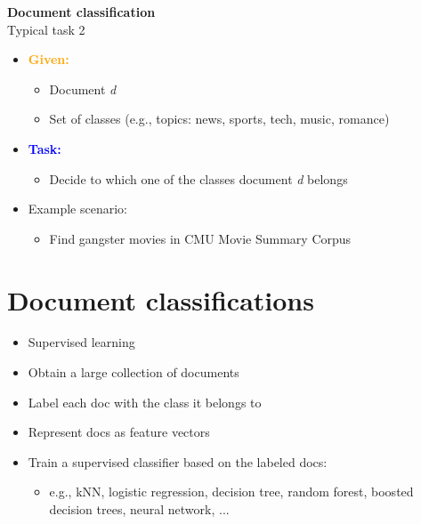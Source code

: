 \documentclass[11pt]{article}
\begin{document}
\vspace{0.5cm}

\begin{center}
  {\LARGE \textbf{Document classification}} \\
  Typical task 2
\end{center}
\vspace{0.5cm}
\begin{itemize}
	\item \textbf{\textcolor{orange}{Given:}}
		\begin{itemize}
			\item Document \textit{d}
			\item Set of classes (e.g., topics: news, sports, tech, music, romance)
		\end{itemize}
	\item \textbf{\textcolor{blue}{Task:}}
		\begin{itemize}
			\item Decide to which one of the classes document \textit{d} belongs
		\end{itemize}
	\item Example scenario:
		\begin{itemize}
			\item Find gangster movies in CMU Movie Summary Corpus
		\end{itemize}
\end{itemize}

\section*{Document classifications}

\begin{itemize}
	\item Supervised learning 
	\item Obtain a large collection of documents
	\item Label each doc with the class it belongs to
	\item Represent docs as feature vectors
	\item Train a supervised classifier based on the labeled docs:
		\begin{itemize}
			\item e.g., kNN, logistic regression, decision tree, random forest, boosted decision trees, neural network, ...
		\end{itemize}
\end{itemize}

\vspace{0.5cm}
\end{document}
